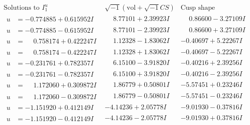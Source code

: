\documentclass[1p]{elsarticle_modified}
\theoremstyle{definition}
\newcommand{\I}{\sqrt{-1}}
\begin{document}
$$\begin{array}{c|c|c}  
\text{Solutions to }I^u_{1}& \I (\text{vol} + \sqrt{-1}CS) & \text{Cusp shape}\\
 \hline 
\begin{aligned}
u &= -0.774885 + 0.615952 I\end{aligned}
 & \phantom{-}8.77101 + 2.39923 I & \phantom{-}0.86600 - 3.27109 I \\ \hline\begin{aligned}
u &= -0.774885 - 0.615952 I\end{aligned}
 & \phantom{-}8.77101 - 2.39923 I & \phantom{-}0.86600 + 3.27109 I \\ \hline\begin{aligned}
u &= \phantom{-}0.758174 + 0.422247 I\end{aligned}
 & \phantom{-}1.12328 - 1.83062 I & -0.40697 + 5.22267 I \\ \hline\begin{aligned}
u &= \phantom{-}0.758174 - 0.422247 I\end{aligned}
 & \phantom{-}1.12328 + 1.83062 I & -0.40697 - 5.22267 I \\ \hline\begin{aligned}
u &= -0.231761 + 0.782357 I\end{aligned}
 & \phantom{-}6.15100 - 3.91820 I & -0.40216 + 2.39256 I \\ \hline\begin{aligned}
u &= -0.231761 - 0.782357 I\end{aligned}
 & \phantom{-}6.15100 + 3.91820 I & -0.40216 - 2.39256 I \\ \hline\begin{aligned}
u &= \phantom{-}1.172060 + 0.309872 I\end{aligned}
 & \phantom{-}1.86779 + 0.50801 I & -5.57451 + 0.23246 I \\ \hline\begin{aligned}
u &= \phantom{-}1.172060 - 0.309872 I\end{aligned}
 & \phantom{-}1.86779 - 0.50801 I & -5.57451 - 0.23246 I \\ \hline\begin{aligned}
u &= -1.151920 + 0.412149 I\end{aligned}
 & -4.14236 + 2.05778 I & -9.01930 - 0.37816 I \\ \hline\begin{aligned}
u &= -1.151920 - 0.412149 I\end{aligned}
 & -4.14236 - 2.05778 I & -9.01930 + 0.37816 I \\ \hline\begin{aligned}

\end{aligned}
\end{array}$$
\end{document}
